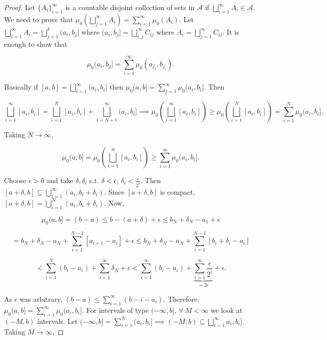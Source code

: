 \documentclass{functionspaces}
\begin{document}
\begin{proof}
Let $\{A_{i}\}_{i=1}^{\infty}$ is a countable disjoint collection of sets in $\mathcal{A}$ if $\bigsqcup_{i=1}^{\infty} A_{i} \in \mathcal{A}.$ We need to prove that $\mu_{0}(\bigsqcup_{j=1}^{\infty} A_{i}) = \sum_{i=1}^{\infty} \mu_{0}(A_{i}).$ Let $\bigsqcup_{i=1}^{\infty} A_{i} = \bigsqcup_{j=1}^{k} (a_{i},b_{j}]$ where $(a_{i},b_{j}] = \bigsqcup_{i,j}^{\infty} C_{ij}$ where $A_{i} = \bigsqcup_{j=1}^{\infty} C_{ij}.$ It is enough to show that

\[
\mu_{0}(a_{i},b_{j}] = \sum_{i=1}^{\infty} \mu_{0}(a_{j_{i}},b_{j_{i}}).
\]

Basically if $[a,b] = \bigsqcup_{i=1}^{\infty} (a_{i},b_{i}]$ then $\mu_{0}(a,b] = \sum_{j=1}^{\infty} \mu_{0}(a_{i},b_{i}]$. Then

\[
\bigsqcup_{i=1}^{\infty} [a_{i},b_{i}] = \bigsqcup_{i=1}^{N} [a_{i},b_{i}] + \bigsqcup_{i=N+1}^{\infty} (a_{i},b_{i}] \implies \mu_{0}\left(\bigsqcup_{i=1}^{\infty} [a_{i},b_{i}]\right) \geq \mu_{0}\left(\bigsqcup_{i=1}^{N} [a_{i},b_{i}]\right) = \sum_{i=1}^{N} \mu_{0}(a_{i},b_{i}].
\]

Taking $N \to \infty$,

\[
\mu_{0}(a,b] = \mu_{0}\left(\bigsqcup_{i=1}^{\infty} [a_{i},b_{i}]\right) \geq \sum_{i=1}^{\infty} \mu_{0}(a_{i},b_{i}].
\]

Choose $\epsilon > 0$ and take $\delta,\delta_{i}$ s.t. $\delta < \epsilon$, $\delta_{i} < \frac{\epsilon}{2^{i}}$. Then $[a+\delta,b] \subseteq \bigcup_{i=1}^{\infty} (a_{i},b_{i} + \delta_{i})$. Since $[a+\delta,b]$ is compact, $[a+\delta,b] = \bigcup_{i=1}^{N} (a_{i},b_{i} + \delta_{i})$. Now,

\[
\mu_{0}(a,b] = (b-a) \leq b-(a+\delta) + \epsilon \leq b_{N} + \delta_{N} - a_{1} + \epsilon
\]

\[
= b_{N} + \delta_{N} - a_{N} + \sum_{i=1}^{N-1} [a_{i+1} - a_{i}] + \epsilon \leq b_{N} + \delta_{N} - a_{N} + \sum_{i=1}^{N-1} [b_{i} + \delta_{i} - a_{i}]
\]

\[
< \sum_{i=1}^{N} (b_{i} - a_{i}) + \sum_{i=1}^{\infty} \delta_{N} + \epsilon < \sum_{i=1}^{\infty} (b_{i} - a_{i}) + \underbrace{\sum_{i=1}^{\infty} \frac{\epsilon}{2^{i}}}_{=2\epsilon} + \epsilon.
\]

As $\epsilon$ was arbitrary, $(b-a) \leq \sum_{i=1}^{\infty} (b-i - a_{i})$. Therefore, $\mu_{0}(a,b] = \sum_{i=1}^{\infty} \mu_{0}(a_{i},b_{i}]$. For intervals of type $(-\infty,b]$, $\forall\ M < \infty$ we look at $(-M,b)$ intervals. Let $(-\infty,b] = \sum_{i=1}^{N} (a_{i},b_{i}] \implies (-M,b) \subseteq \bigsqcup_{i=1}^{\infty} a_{i},b_{i}]$. Taking $M \to \infty$,


\end{proof}
\end{document}
